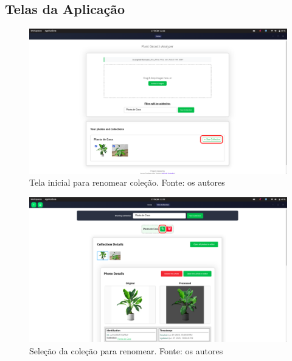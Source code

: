 \subsection{Telas da Aplicação}

\begin{figure}[H]
    \centering
    \includegraphics[width=1\textwidth]{../figures/screens/uc008/Screenshot from 2025-06-27 22-12-41.png}
    \caption{Tela inicial para renomear coleção. Fonte: os autores}
    \label{fig:uc008-screen1}
\end{figure}

\begin{figure}[H]
    \centering
    \includegraphics[width=1\textwidth]{../figures/screens/uc008/Screenshot from 2025-06-27 22-12-47.png}
    \caption{Seleção da coleção para renomear. Fonte: os autores}
    \label{fig:uc008-screen2}
\end{figure}

